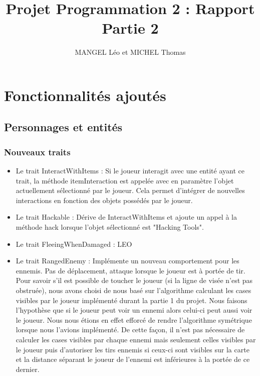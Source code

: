 \documentclass[10pt,a4paper]{article}
\title{Projet Programmation 2 : Rapport Partie 2}
\author{MANGEL Léo et MICHEL Thomas}
\date{}
\begin{document}
\maketitle

\section{Fonctionnalités ajoutés}

\subsection{Personnages et entités}
\subsubsection{Nouveaux traits}
\begin{itemize}
    \item Le trait InteractWithItems : Si le joueur interagit avec une entité ayant ce trait, la méthode itemInteraction est appelée avec en paramètre l'objet actuellement sélectionné par le joueur. Cela permet d'intégrer de nouvelles interactions en fonction des objets possédés par le joueur.
    \item Le trait Hackable : Dérive de InteractWithItems et ajoute un appel à la méthode hack lorsque l'objet sélectionné est "Hacking Tools".
    \item Le trait FleeingWhenDamaged : LEO
    \item Le trait RangedEnemy : Implémente un nouveau comportement pour les ennemis. Pas de déplacement, attaque lorsque le joueur est à portée de tir. Pour savoir s'il est possible de toucher le joueur (si la ligne de visée n'est pas obstruée), nous avons choisi de nous basé sur l'algorithme calculant les cases visibles par le joueur implémenté durant la partie 1 du projet. Nous faisons l'hypothèse que si le joueur peut voir un ennemi alors celui-ci peut aussi voir le joueur. Nous nous étions en effet efforcé de rendre l'algorithme symétrique lorsque nous l'avions implémenté. De cette façon, il n'est pas nécessaire de calculer les cases visibles par chaque ennemi mais seulement celles visibles par le joueur puis d'autoriser les tirs ennemis si ceux-ci sont visibles sur la carte et la distance séparant le joueur de l'ennemi est inférieures à la portée de ce dernier.
\end{itemize}
\end{document}
